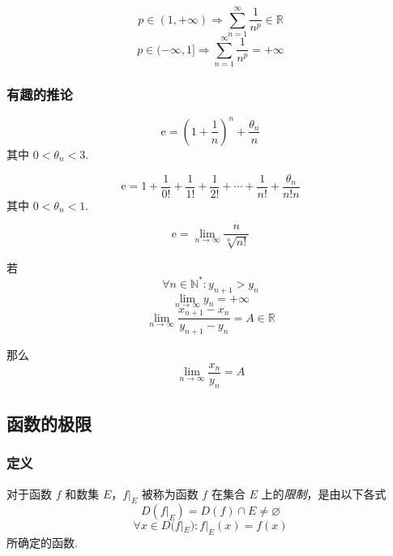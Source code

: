 \begin{theorem}
    \[p \in (1, +\infty) \Rightarrow \sum_{n=1}^{\infty} \frac{1}{n^p} \in \mathbb{R}\]
    \[p \in (-\infty, 1] \Rightarrow \sum_{n=1}^{\infty} \frac{1}{n^p} = +\infty\]
\end{theorem}

\subsubsection{有趣的推论}
\begin{theorem}
    \[\mathrm{e} = \left(1 + \frac{1}{n}\right)^n + \frac{\theta_n}{n}\]
    其中 $0 < \theta_n < 3$.
\end{theorem}\vspace{9pt}

\begin{theorem}
    \[\mathrm{e} = 1 + \frac{1}{0!} + \frac{1}{1!} + \frac{1}{2!} + \cdots + \frac{1}{n!} + \frac{\theta_n}{n!n}\]
    其中 $0 < \theta_n < 1$.
\end{theorem}\vspace{9pt}

\begin{theorem}
    \[\mathrm{e} = \lim_{n \rightarrow \infty} \frac{n}{\sqrt[n]{n!}}\]
\end{theorem}\vspace{9pt}

\begin{theorem}
    若
    \[\forall n \in \mathbb{N}^*: y_{n+1} > y_n\]
    \[\lim_{n \rightarrow \infty} y_n = +\infty\]
    \[\lim_{n \rightarrow \infty} \frac{x_{n+1} - x_n}{y_{n+1} - y_n} = A \in \mathbb{R}\]

    那么
    \[\lim_{n \rightarrow \infty} \frac{x_n}{y_n} = A\]
\end{theorem}

\subsection{函数的极限}
\subsubsection{定义}
\begin{definition}
    对于函数 $f$ 和数集 $E$，$f|_E$ 被称为函数 $f$ 在集合 $E$ 上的\emph{限制}，是由以下各式
    \[D(f|_E) = D(f) \cap E \neq \varnothing\]
    \[\forall x \in D(f|_E): f|_E(x) = f(x)\]
    所确定的函数.
\end{definition}\vspace{9pt}

